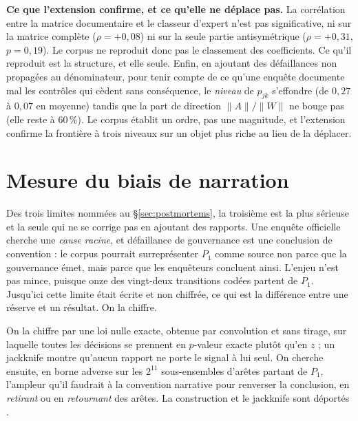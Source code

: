 \begin{cle}
\textbf{Ce que l'extension confirme, et ce qu'elle ne déplace pas.} La corrélation entre la
matrice documentaire et le classeur d'expert n'est pas significative, ni sur la matrice
complète ($\rho=+0{,}08$) ni sur la seule partie antisymétrique ($\rho=+0{,}31$, $p=0{,}19$).
Le corpus ne reproduit donc pas le classement des coefficients. Ce qu'il reproduit est la structure, et elle seule. Enfin, en
ajoutant des défaillances non propagées au dénominateur, pour tenir compte de ce qu'une enquête
documente mal les contrôles qui cèdent sans conséquence, le \emph{niveau} de $p_{jk}$ s'effondre
(de $0{,}27$ à $0{,}07$ en moyenne) tandis que la part de direction
$\lVert A\rVert/\lVert W\rVert$ ne bouge pas (elle reste à $60\,\%$). Le corpus établit un
ordre, pas une magnitude, et l'extension confirme la frontière à trois niveaux sur un
objet plus riche au lieu de la déplacer.
\end{cle}


\section{Mesure du biais de narration}

Des trois limites nommées au \S\ref{sec:postmortems}, la troisième est la plus sérieuse et la
seule qui ne se corrige pas en ajoutant des rapports. Une enquête officielle cherche une
\emph{cause racine}, et \og défaillance de gouvernance\fg{} est une conclusion de convention : le
corpus pourrait surreprésenter $P_1$ comme source non parce que la gouvernance émet, mais parce
que les enquêteurs concluent ainsi. L'enjeu n'est pas mince, puisque onze des vingt-deux
transitions codées partent de $P_1$. Jusqu'ici cette limite était écrite et non chiffrée, ce
qui est la différence entre une réserve et un résultat. On la chiffre.

On la chiffre par une loi nulle exacte, obtenue par convolution et sans tirage, sur laquelle
toutes les décisions se prennent en $p$-valeur exacte plutôt qu'en $z$ ; un jackknife montre
qu'aucun rapport ne porte le signal à lui seul. On cherche ensuite, en borne adverse sur les
$2^{11}$ sous-ensembles d'arêtes partant de $P_1$, l'ampleur qu'il faudrait à la convention
narrative pour renverser la conclusion, en \emph{retirant} ou en \emph{retournant} des arêtes.
La construction et le jackknife sont déportés \matcomp.

